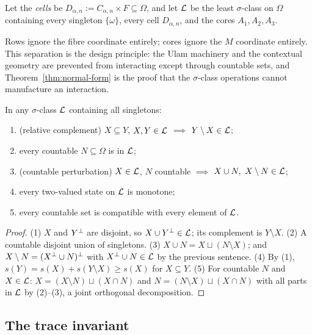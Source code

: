 \begin{definition}\label{def:carrier}
Let the \emph{cells} be $D_{\alpha,n} := C_{\alpha,n}\times F\subseteq\Omega$, and
let $\mathcal{L}$ be the least $\sigma$-class on $\Omega$ containing every singleton
$\{\omega\}$, every cell $D_{\alpha,n}$, and the cores $A_1,A_2,A_3$.
\end{definition}

Rows ignore the fibre coordinate entirely; cores ignore the $M$ coordinate
entirely. This separation is the design principle: the Ulam machinery and the
contextual geometry are prevented from interacting except through countable
sets, and Theorem~\ref{thm:normal-form} is the proof that the $\sigma$-class
operations cannot manufacture an interaction.

\begin{lemma}\label{lem:sigma-class-basics}
In any $\sigma$-class $\mathcal{L}$ containing all singletons:
\begin{enumerate}[label=\textup{(\arabic*)}]
  \item (relative complement) $X\subseteq Y$, $X,Y\in\mathcal{L}$ $\implies$
    $Y\setminus X\in\mathcal{L}$;
  \item every countable $N\subseteq\Omega$ is in $\mathcal{L}$;
  \item (countable perturbation) $X\in\mathcal{L}$, $N$ countable $\implies$
    $X\cup N,\ X\setminus N\in\mathcal{L}$;
  \item every two-valued state on $\mathcal{L}$ is monotone;
  \item every countable set is compatible with every element of $\mathcal{L}$.
\end{enumerate}
\end{lemma}

\begin{proof}
(1) $X$ and $Y{}^{\perp}$ are disjoint, so $X\cup Y{}^{\perp}\in\mathcal{L}$; its complement is
$Y\setminus X$. (2) A countable disjoint union of singletons. (3)
$X\cup N = X\sqcup(N\setminus X)$; and $X\setminus N = (X{}^{\perp}\cup N){}^{\perp}$ with
$X{}^{\perp}\cup N\in\mathcal{L}$ by the previous sentence. (4) By (1),
$s(Y)=s(X)+s(Y\setminus X)\ge s(X)$ for $X\subseteq Y$. (5) For countable $N$ and
$X\in\mathcal{L}$: $X=(X\setminus N)\sqcup(X\cap N)$ and $N=(N\setminus X)\sqcup(X\cap N)$
with all parts in $\mathcal{L}$ by (2)--(3), a joint orthogonal decomposition.
\end{proof}

\subsection{The trace invariant}

